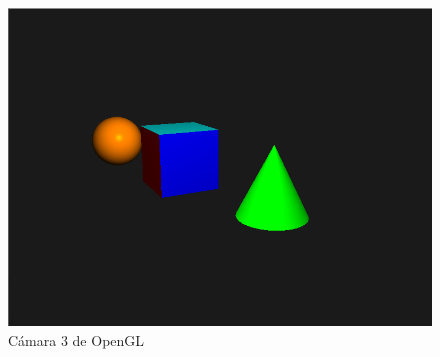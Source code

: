 \documentclass{article}
\begin{document}
\begin{figure}[H]
\centering
\includegraphics[width=\linewidth]{3gl}
\caption{Cámara 3 de OpenGL}
\label{fig:3gl}
\end{figure}
\end{document}

